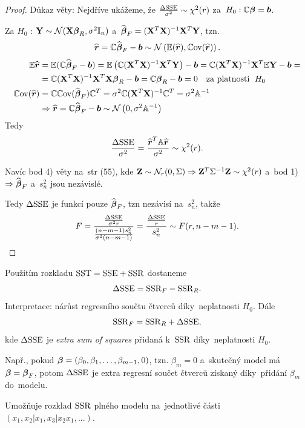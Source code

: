 \begin{proof}
Důkaz věty: Nejdříve ukážeme, že $\frac{\Delta \mathrm{SSE}}{\sigma^2} \sim \chi^2 (r)$ za~$H_0: \mathbb{C}\boldsymbol{\beta} = \boldsymbol{b}$.

Za $H_0$ : $\mathbf{Y} \sim \mathcal{N}(\mathbf{X} \boldsymbol{\beta}_R, \sigma^2 \mathbb{I}_{n})$ a~$\widehat{\boldsymbol{\beta}}_F = (\mathbf{X}^T \mathbf{X})^{-1} \mathbf{X}^T \mathbf{Y}$, tzn.
 $$
\widehat{\boldsymbol{r}} = \mathbb{C} \widehat{\boldsymbol{\beta}}_F - \boldsymbol{b} \sim \mathcal{N}\left(\mathbb{E}(\widehat{\boldsymbol{r}}), \mathbb{C}\mathrm{ov}(\widehat{\boldsymbol{r}}) \right).
 $$
\begin{align*}
\mathbb{E} \widehat{\boldsymbol{r}} & = \mathbb{E} (\mathbb{C} \widehat{\boldsymbol{\beta}}_F - \boldsymbol{b}) = \mathbb{E} \left(\mathbb{C} (\mathbf{X}^T \mathbf{X})^{-1} \mathbf{X}^T \mathbf{Y} \right) - \boldsymbol{b} = \mathbb{C} (\mathbf{X}^T \mathbf{X})^{-1} \mathbf{X}^T \mathbb{E} \mathbf{Y} - \boldsymbol{b} = \\
& = \mathbb{C} (\mathbf{X}^T \mathbf{X})^{-1} \mathbf{X}^T \mathbf{X} \boldsymbol{\beta}_R - \boldsymbol{b} = \mathbb{C} \boldsymbol{\beta}_R - \boldsymbol{b} = 0 \quad \text{za platnosti \;} H_0 \\
\mathbb{C}\mathrm{ov}(\widehat{\boldsymbol{r}}) & = \mathbb{C} \mathbb{C}\mathrm{ov}(\widehat{\boldsymbol{\beta}}_F) \mathbb{C}^T = \sigma^2 \mathbb{C} (\mathbf{X}^T \mathbf{X})^{-1} \mathbb{C}^T = \sigma^2 \mathbb{A}^{-1} \\
& \Rightarrow \widehat{\boldsymbol{r}} = \mathbb{C} \widehat{\boldsymbol{\beta}}_F - \boldsymbol{b} \sim \mathcal{N} \left(0, \sigma^2 \mathbb{A}^{-1} \right)
\end{align*}
Tedy
 $$
\frac{\Delta \mathrm{SSE}}{\sigma^2} = \frac{\widehat{\boldsymbol{r}}^T \mathbb{A} \widehat{\boldsymbol{r}}}{\sigma^2} \sim \chi^2(r).
 $$

Navíc bod 4) věty na~str (55), kde $\mathbf{Z} \sim \mathcal{N}_r(0, \Sigma) \Rightarrow \mathbf{Z}^T \Sigma^{-1} \mathbf{Z} \sim \chi^2(r)$ a~bod 1) $\Rightarrow \widehat{\boldsymbol{\beta}}_F$ a~$s_n^2$ jsou nezávislé.

Tedy $\Delta \mathrm{SSE}$ je funkcí pouze $\widehat{\boldsymbol{\beta}}_F$, tzn nezávisí na~$s_n^2$, takže
 $$
F = \frac{\frac{\Delta \mathrm{SSE}}{\sigma^2 r}}{\frac{(n-m-1)s_n^2}{\sigma^2(n-m-1)}} = \frac{\frac{\Delta \mathrm{SSE}}{r}}{s_n^2} \sim F(r, n-m-1).
 $$
\end{proof}

\begin{remark}
Použitím rozkladu $\mathrm{SST} = \mathrm{SSE} + \mathrm{SSR}$ dostaneme
 $$
\Delta \mathrm{SSE} = \mathrm{SSR}_F - \mathrm{SSR}_R.
 $$
Interpretace: nárůst regresního součtu čtverců díky~neplatnosti $H_0$. Dále
 $$
\mathrm{SSR}_F = \mathrm{SSR}_R + \Delta \mathrm{SSE},
 $$
kde $\Delta \mathrm{SSE}$ je \textit{extra sum of squares} přidaná k~$\mathrm{SSR}$ díky~neplatnosti $H_0$.

Např., pokud $\boldsymbol{\beta} = (\beta_0, \beta_1,\dots, \beta_{m-1}, 0)$, tzn. $\beta_m = 0$ a~skutečný model má $\boldsymbol{\beta} = \boldsymbol{\beta}_F$, potom $\Delta \mathrm{SSE}$ je extra regresní součet čtverců získaný díky~přidání $\beta_m$ do~modelu.

Umožňuje rozklad $\mathrm{SSR}$ plného modelu na~jednotlivé části $\left(x_1, x_2 | x_1, x_3 | x_2 x_1,... \right)$.
\end{remark}

